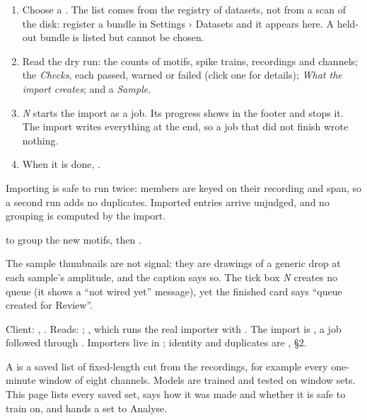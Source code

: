 \begin{enumerate}
  \item Choose a . The list comes from the registry of datasets, not from a scan
    of the disk: register a bundle in Settings › Datasets and it appears here. A held-out
    bundle is listed but cannot be chosen.
  \item Read the dry run: the counts of motifs, spike trains, recordings and channels; the
    \emph{Checks}, each passed, warned or failed (click one for details); \emph{What the
    import creates}; and a \emph{Sample}.
  \item {} \emph{N}  starts the import as a job. Its progress shows in the
    footer and  stops it. The import writes everything at the end, so a
    job that did not finish wrote nothing.
  \item When it is done, .
\end{enumerate}
Importing is safe to run twice: members are keyed on their recording and span, so a second
run adds no duplicates. Imported entries arrive unjudged, and no grouping is computed by the
import.

 to group the new motifs, then .

\begin{watchout}
The sample thumbnails are not signal: they are drawings of a generic drop at each sample's
amplitude, and the caption says so. The tick box  \emph{N}  creates no queue (it shows a ``not wired yet'' message), yet the finished card says
``queue created for Review''.
\end{watchout}

\begin{underthehood}[Import]
Client: , . Reads:
; , which runs the
real importer with . The import is , a job
followed through . Importers live in
; identity and duplicates are ,
§2.
\end{underthehood}

A  is a saved list of fixed-length  cut from
the recordings, for example every one-minute window of eight channels. Models are trained and
tested on window sets. This page lists every saved set, says how it was made and whether it is
safe to train on, and hands a set to Analyse.

